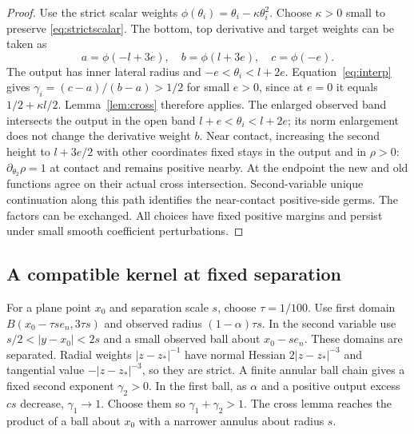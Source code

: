 \documentclass[11pt]{article}
\theoremstyle{definition}\newtheorem{definition}[theorem]{Definition}
\theoremstyle{remark}\newtheorem{remark}[theorem]{Remark}
\begin{document}
\begin{proof}
Use the strict scalar weights $\phi(\theta_i)=\theta_i-\kappa\theta_i^2$.
Choose $\kappa>0$ small to preserve \eqref{eq:strictscalar}. The bottom,
top derivative and target weights can be taken as
\[
 a=\phi(-l+3e),\quad b=\phi(l+3e),\quad c=\phi(-e).
\]
The output has inner lateral radius and $-e<\theta_i<l+2e$.
Equation~\eqref{eq:interp} gives
$\gamma_i=(c-a)/(b-a)>1/2$ for small $e>0$, since at $e=0$ it equals
$1/2+\kappa l/2$. Lemma~\ref{lem:cross} therefore applies.
The enlarged observed band intersects the output in the open band
$l+e<\theta_i<l+2e$; its norm enlargement does not change the derivative
weight $b$. Near contact, increasing the second height to $l+3e/2$
with other coordinates fixed stays in the output and in $\rho>0$:
$\partial_{\theta_2}\rho=1$ at contact and remains positive nearby.
At the endpoint the new and old functions agree on their actual cross
intersection. Second-variable unique continuation along this path
identifies the near-contact positive-side germs. The factors can be
exchanged. All choices have fixed positive margins and persist under
small smooth coefficient perturbations.
\end{proof}

\subsection{A compatible kernel at fixed separation}\label{subsec:fixed}
For a plane point $x_0$ and separation scale $s$, choose $\tau=1/100$.
Use first domain $B(x_0-\tau se_n,3\tau s)$ and observed radius
$(1-\alpha)\tau s$. In the second variable use
$s/2<|y-x_0|<2s$ and a small observed ball about $x_0-se_n$.
These domains are separated. Radial weights $|z-z_*|^{-1}$ have
normal Hessian $2|z-z_*|^{-3}$ and tangential value $-|z-z_*|^{-3}$,
so they are strict. A finite annular ball chain gives a fixed second
exponent $\gamma_2>0$. In the first ball, as $\alpha$ and a positive
output excess $cs$ decrease, $\gamma_1\to1$.
Choose them so $\gamma_1+\gamma_2>1$.
The cross lemma reaches the product of a ball about $x_0$ with a
narrower annulus about radius $s$.
\end{document}
